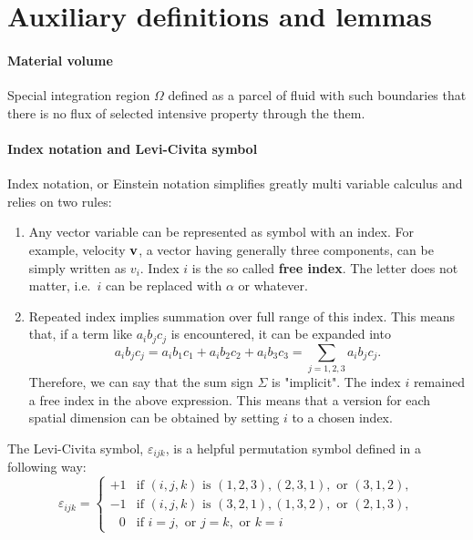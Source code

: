\documentclass{article}
\providecommand{\levicivita}[3]{%
  \ensuremath{\varepsilon_{{#1}{#2}{#3}}}
}
\begin{document}
\section*{Auxiliary definitions and lemmas}

\paragraph{Material volume}
Special integration region \(\Omega\) defined as a parcel of fluid
with such boundaries that there is no flux of selected intensive property 
through the them.

\paragraph{Index notation and Levi-Civita symbol}
Index notation, or Einstein notation simplifies greatly multi variable 
calculus and relies on two rules:
\begin{enumerate}
  \item Any vector variable can be represented as symbol with an index.
    For example, velocity \(\vb{v}\), a vector having generally three 
    components, can be simply written as \(v_i\). Index \(i\) is the so 
    called \textbf{free index}. The letter does not matter, i.e.\ \(i\) can
    be replaced with \(\alpha\) or whatever.
  \item Repeated index implies summation over full range of this index. 
    This means that, if a term like \(a_i b_j c_j\) is encountered, it can
    be expanded into
    \[
      a_i b_j c_j = a_i b_1 c_1 + a_i b_2 c_2 + a_i b_3 c_3 =
      \sum\limits_{j=1,2,3} a_i b_j c_j.
    \]
    Therefore, we can say that the sum sign \(\Sigma\) is "implicit". The index
    \(i\) remained a free index in the above expression. This means that a
    version for each spatial dimension can be obtained by setting \(i\) to 
    a chosen index.
\end{enumerate}
The Levi-Civita symbol, \(\levicivita{i}{j}{k}\), is a helpful permutation
symbol defined in a following way:
\begin{equation*}
\varepsilon_{ijk} = \begin{cases}
         +1 & \text{if } (i,j,k) \text{ is } (1,2,3), (2,3,1), \text{ or } (3,1,2), \\
         -1 & \text{if } (i,j,k) \text{ is } (3,2,1), (1,3,2), \text{ or } (2,1,3), \\
    \;\;\,0 & \text{if } i = j, \text{ or } j = k, \text{ or } k = i
\end{cases}
\end{equation*}
\end{document}
